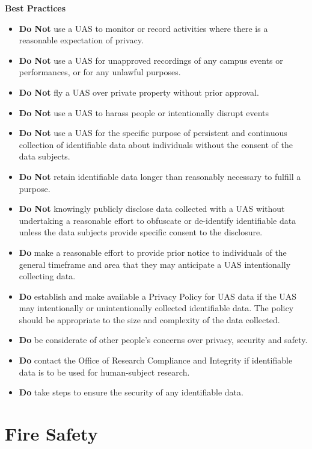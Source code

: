 \documentclass[
]{book}
\providecommand{\tightlist}{%
  \setlength{\itemsep}{0pt}\setlength{\parskip}{0pt}}
\begin{document}
\textbf{Best Practices}

\begin{itemize}
\tightlist
\item
  \textbf{Do Not} use a UAS to monitor or record activities where there is a reasonable expectation of privacy.
\item
  \textbf{Do Not} use a UAS for unapproved recordings of any campus events or performances, or for any unlawful purposes.
\item
  \textbf{Do Not} fly a UAS over private property without prior approval.
\item
  \textbf{Do Not} use a UAS to harass people or intentionally disrupt events
\item
  \textbf{Do Not} use a UAS for the specific purpose of persistent and continuous collection of identifiable data about individuals without the consent of the data subjects.
\item
  \textbf{Do Not} retain identifiable data longer than reasonably necessary to fulfill a purpose.
\item
  \textbf{Do Not} knowingly publicly disclose data collected with a UAS without undertaking a reasonable effort to obfuscate or de-identify identifiable data unless the data subjects provide specific consent to the disclosure.
\item
  \textbf{Do} make a reasonable effort to provide prior notice to individuals of the general timeframe and area that they may anticipate a UAS intentionally collecting data.
\item
  \textbf{Do} establish and make available a Privacy Policy for UAS data if the UAS may intentionally or unintentionally collected identifiable data. The policy should be appropriate to the size and complexity of the data collected.
\item
  \textbf{Do} be considerate of other people's concerns over privacy, security and safety.
\item
  \textbf{Do} contact the Office of Research Compliance and Integrity if identifiable data is to be used for human-subject research.
\item
  \textbf{Do} take steps to ensure the security of any identifiable data.
\end{itemize}

\hypertarget{ch-fire-safety}{%
\chapter{Fire Safety}\label{ch-fire-safety}}
\end{document}
